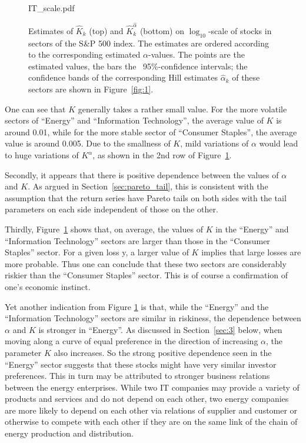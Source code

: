 \begin{figure}[htb!]
\begin{minipage}{0.33\linewidth}
    {IT_scale.pdf}
  \end{minipage}
  \caption{\small Estimates of $\hat K_k$ (top) and $\hat K_k^{\hat
      \alpha}$ (bottom) on $\log_{10}$-scale of stocks in sectors
    of the S\&P 500 index. The estimates are ordered according to the 
    corresponding estimated $\alpha$-values.
    The points are the estimated values, the bars 
    the \asy\ 95\%-confidence intervals; the confidence bands of the
    corresponding Hill estimates $\hat \alpha_k$ of these sectors are
    shown in Figure~\ref{fig:1}. 
  }
  \label{fig:sectors_parameters}
\end{figure}
One can see that $K$ generally takes a rather small value. For the
more volatile sectors of ``Energy'' and ``Information Technology'',
the average value of $K$ is around 0.01, while for the more stable
sector of ``Consumer Staples'', the average value is around 0.005. Due
to the smallness of $K$, mild variations of $\alpha$ would lead to
huge variations of $K^\alpha$, as shown in the 2nd row of
Figure~\ref{fig:sectors_parameters}.
\par
Secondly, it appears that there is positive dependence between the
values of $\alpha$ and $K$.
As argued in Section~\ref{sec:pareto_tail}, this is consistent with
the assumption that the return series have Pareto tails on both sides
with the tail parameters on each side independent of those on the
other.

\par
Thirdly, Figure~\ref{fig:sectors_parameters} shows that, on
average, the values of $K$
in the ``Energy'' and ``Information Technology'' sectors are  larger
than those in the ``Consumer Staples'' sector.  For a given loss \pro y, 
a larger value of $K$ implies that large losses are more
probable. Thus one can conclude that these two sectors are
considerably riskier than the ``Consumer Staples'' sector. This is of
course a confirmation of one's economic instinct.

Yet another indication from Figure \ref{fig:sectors_parameters} is
that, while the ``Energy'' and the ``Information Technology'' sectors
are similar in riskiness, the dependence  between $\alpha$ and $K$ is
stronger in ``Energy''. As discussed in Section~\ref{sec:3} below, when moving along
a curve of equal preference in the direction of increasing $\alpha$, the parameter $K$ also
increases. So the strong positive dependence seen in the ``Energy''
sector suggests that these stocks might have very similar investor
preferences. This in turn may be attributed to stronger business
relations between the energy enterprises. While two IT companies
may provide a variety of products and services and do not depend on each
other, two energy companies are more likely to depend on each other
via relations of supplier and customer or otherwise to compete with each
other if they are on the same link of the chain of energy production
and distribution.

